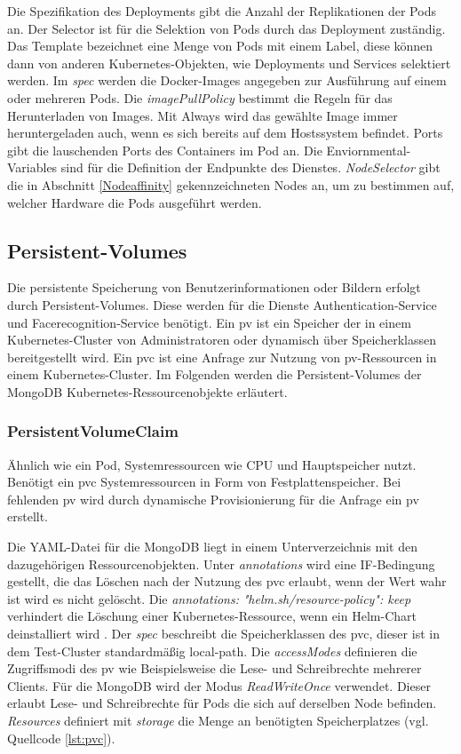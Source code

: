 Die Spezifikation des Deployments gibt die Anzahl der Replikationen der Pods an.
Der Selector ist für die Selektion von Pods durch das Deployment zuständig.
Das Template bezeichnet eine Menge von Pods mit einem Label, diese können dann von anderen Kubernetes-Objekten, wie Deployments und Services selektiert werden.
Im \textit{spec} werden die Docker-Images angegeben zur Ausführung auf einem oder mehreren Pods.
Die \textit{imagePullPolicy} bestimmt die Regeln für das Herunterladen von Images.
Mit Always wird das gewählte Image immer heruntergeladen auch, wenn es sich bereits auf dem Hostssystem befindet.
Ports gibt die lauschenden Ports des Containers im Pod an.
Die Enviornmental-Variables sind für die Definition der Endpunkte des Dienstes.
\textit{NodeSelector} gibt die in Abschnitt \ref{Nodeaffinity} gekennzeichneten Nodes an, um zu bestimmen auf, welcher Hardware die Pods ausgeführt werden.


\subsection{Persistent-Volumes}

Die persistente Speicherung von Benutzerinformationen oder Bildern erfolgt durch Persistent-Volumes.
Diese werden für die Dienste Authentication-Service und Facerecognition-Service benötigt.
Ein \ac{pv} ist ein Speicher der in einem Kubernetes-Cluster von Administratoren oder dynamisch über Speicherklassen bereitgestellt wird.
Ein \ac{pvc} ist eine Anfrage zur Nutzung von \acs{pv}-Ressourcen in einem Kubernetes-Cluster.
Im Folgenden werden die Persistent-Volumes der MongoDB Kubernetes-Ressourcenobjekte erläutert.


\subsubsection{PersistentVolumeClaim}

Ähnlich wie ein Pod, Systemressourcen wie CPU und Hauptspeicher nutzt.
Benötigt ein \acs{pvc} Systemressourcen in Form von Festplattenspeicher.
Bei fehlenden \acs{pv} wird durch dynamische Provisionierung für die Anfrage ein \acs{pv} erstellt.

Die YAML-Datei für die MongoDB liegt in einem Unterverzeichnis mit den dazugehörigen Ressourcenobjekten.
Unter \textit{annotations} wird eine IF-Bedingung gestellt, die das Löschen nach der Nutzung des \acs{pvc} erlaubt, wenn der Wert wahr ist wird es nicht gelöscht.
Die \textit{annotations: }\textit{"helm.sh/resource-policy": keep} verhindert die Löschung einer Kubernetes-Ressource, wenn ein Helm-Chart deinstalliert wird \cite{helmtipsandtricks}.
Der \textit{spec} beschreibt die Speicherklassen des \acs{pvc}, dieser ist in dem Test-Cluster standardmäßig local-path.
Die \textit{accessModes} definieren die Zugriffsmodi des \acs{pv} wie Beispielsweise die Lese- und Schreibrechte mehrerer Clients.
Für die MongoDB wird der Modus \textit{ReadWriteOnce} verwendet.
Dieser erlaubt Lese- und Schreibrechte für Pods die sich auf derselben Node befinden.
\textit{Resources} definiert mit \textit{storage} die Menge an benötigten Speicherplatzes (vgl. Quellcode \ref{lst:pvc}).


